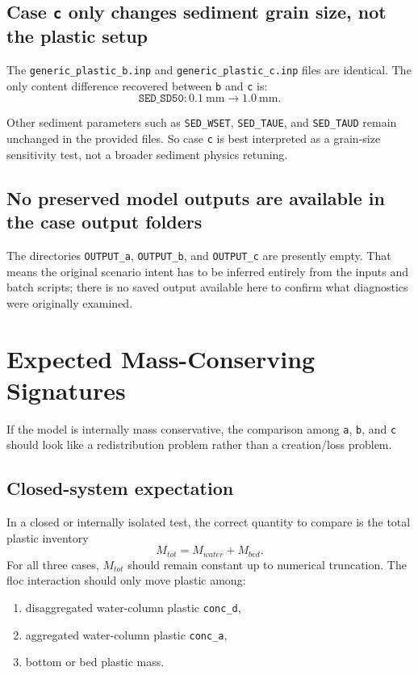 \documentclass[11pt]{article}
\begin{document}
\subsection{Case \texttt{c} only changes sediment grain size, not the plastic setup}
The \texttt{generic\_plastic\_b.inp} and \texttt{generic\_plastic\_c.inp} files are identical. The only
content difference recovered between \texttt{b} and \texttt{c} is:
\[
\texttt{SED\_SD50}: 0.1\ \mathrm{mm} \rightarrow 1.0\ \mathrm{mm}.
\]

Other sediment parameters such as \texttt{SED\_WSET}, \texttt{SED\_TAUE}, and \texttt{SED\_TAUD} remain
unchanged in the provided files. So case \texttt{c} is best interpreted as a grain-size sensitivity test,
not a broader sediment physics retuning.

\subsection{No preserved model outputs are available in the case output folders}
The directories \texttt{OUTPUT\_a}, \texttt{OUTPUT\_b}, and \texttt{OUTPUT\_c} are presently empty. That means
the original scenario intent has to be inferred entirely from the inputs and batch scripts; there is no
saved output available here to confirm what diagnostics were originally examined.

\section{Expected Mass-Conserving Signatures}
If the model is internally mass conservative, the comparison among \texttt{a}, \texttt{b}, and \texttt{c}
should look like a redistribution problem rather than a creation/loss problem.

\subsection{Closed-system expectation}
In a closed or internally isolated test, the correct quantity to compare is the total plastic inventory
\[
M_{tot} = M_{water} + M_{bed}.
\]
For all three cases, \(M_{tot}\) should remain constant up to numerical truncation. The floc interaction
should only move plastic among:
\begin{enumerate}
\item disaggregated water-column plastic \texttt{conc\_d},
\item aggregated water-column plastic \texttt{conc\_a},
\item bottom or bed plastic mass.
\end{enumerate}
\end{document}
